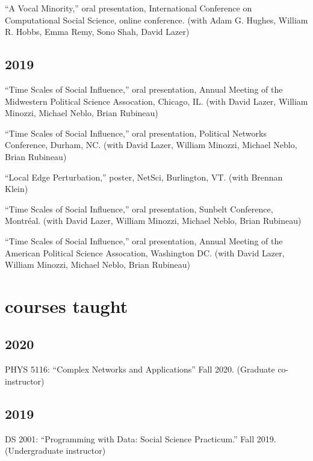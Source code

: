 \documentclass[11pt, letter]{article}
\begin{document}
``A Vocal Minority,'' oral presentation, International Conference on Computational Social Science, online conference. (with Adam G. Hughes, William R. Hobbs, Emma Remy, Sono Shah, David Lazer)

\subsection{2019}

``Time Scales of Social Influence,'' oral presentation, Annual Meeting of the Midwestern Political Science Assocation, Chicago, IL. (with David Lazer, William Minozzi, Michael Neblo, Brian Rubineau)\vspace{2mm}

``Time Scales of Social Influence,'' oral presentation, Political Networks Conference, Durham, NC. (with David Lazer, William Minozzi, Michael Neblo, Brian Rubineau)\vspace{2mm}

``Local Edge Perturbation,'' poster, NetSci, Burlington, VT. (with Brennan Klein)\vspace{2mm}

``Time Scales of Social Influence,'' oral presentation, Sunbelt Conference, Montréal. (with David Lazer, William Minozzi, Michael Neblo, Brian Rubineau)\vspace{2mm}

``Time Scales of Social Influence,'' oral presentation, Annual Meeting of the American Political Science Assocation, Washington DC. (with David Lazer, William Minozzi, Michael Neblo, Brian Rubineau)\vspace{2mm}

\vspace{2mm}
\section{courses taught}
\subsection{2020}
PHYS 5116: ``Complex Networks and Applications'' Fall 2020. (Graduate co-instructor)

\subsection{2019}
DS 2001: ``Programming with Data: Social Science Practicum.'' Fall 2019. (Undergraduate instructor)
\vspace{2mm}
\end{document}
